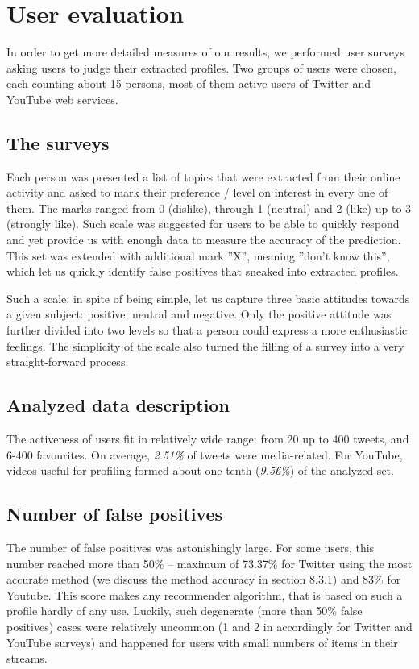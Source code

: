 \section{User evaluation}
In order to get more detailed measures of our results, we performed user surveys
asking users to judge their extracted profiles. Two groups of users were chosen,
each counting about 15 persons, most of them active users of Twitter and YouTube
web services.

\subsection{The surveys}

Each person was presented a list of topics that were extracted from their online
activity and asked to mark their preference / level on interest in every one of
them. The marks ranged from 0 (dislike), through 1 (neutral) and 2 (like) up to
3 (strongly like). Such scale was suggested for users to be able to quickly respond
and yet provide us with enough data to measure the accuracy of the prediction.
This set was extended with additional mark ''X'', meaning
''don't know this'', which let us quickly identify false positives that sneaked
into extracted profiles.

Such a scale, in spite of being simple, let us capture three basic attitudes
towards a given subject: positive, neutral and negative. Only the positive
attitude was further divided into two levels so that a person could express a
more enthusiastic feelings. The simplicity of the scale also turned the filling
of a survey into a very straight-forward process.

\subsection{Analyzed data description}
The activeness of users fit in relatively wide range: from 20 up to 400 tweets,
and 6-400 favourites. On average, \textit{2.51\%} of tweets were media-related.
For YouTube, videos useful for profiling formed about one tenth (\textit{9.56\%})
of the analyzed set.

\subsection{Number of false positives}
The number of false positives was astonishingly large. For some users, this
number reached more than 50\% -- maximum of 73.37\% for Twitter using the most accurate method (we discuss
the method accuracy in section 8.3.1) and 83\% for Youtube. This score makes any recommender
algorithm, that is based on such a profile hardly of any use. Luckily, such degenerate
(more than 50\% false positives) cases were relatively uncommon (1 and 2 in accordingly for
Twitter and YouTube surveys) and happened for users with small numbers of items in their streams.

